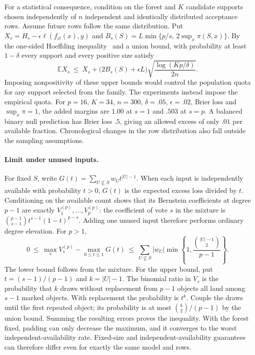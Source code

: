 For a statistical consequence, condition on the forest and $K$ candidate
supports chosen independently of $n$ independent and identically distributed
acceptance rows. Assume future rows follow the same distribution. Put
$X_s=H_s-\epsilon\ell(f_\varnothing(x),y)$ and
$B_s(S)=L\min\{p/s,\,2\sup_x\pi(S,x)\}$. By the one-sided Hoeffding
inequality~\citep{hoeffding1963probability} and a union bound, with probability
at least $1-\delta$ every support and every positive size satisfy
\[
  \mathbb E X_s\ \le\ \overline X_s+
      \bigl(2B_s(S)+\epsilon L\bigr)
      \sqrt{\frac{\log(Kp/\delta)}{2n}} .
\]
Imposing nonpositivity of these upper bounds would control the population
quota for any support selected from the family. The experiments instead
impose the empirical quota. For $p=16$, $K=34$, $n=300$, $\delta=.05$,
$\epsilon=.02$, Brier loss and $\sup_x\pi=1$, the added margins are
$1.00$ at $s=1$ and $.503$ at $s=p$. A balanced binary null prediction has
Brier loss $.5$, giving an allowed excess of only $.01$ per available
fraction. Chronological changes in the row distribution also fall outside
the sampling assumptions.

\paragraph{Limit under unused inputs.}\label{app:padding}
For fixed $S$, write $G(t)=\sum_{U\not\subseteq S} w_U t^{|U|-1}$.
When each input is independently available with probability $t>0$,
$G(t)$ is the expected excess loss divided by $t$. Conditioning on the
available count shows that its Bernstein coefficients at degree $p-1$
are exactly $V_1^{(p)},\ldots,V_p^{(p)}$: the coefficient of vote $s$
in the mixture is $\binom{p-1}{s-1} t^{s-1}(1-t)^{p-s}$. Adding one
unused input therefore performs ordinary degree elevation. For $p>1$,
\[
0\ \le\ \max_s V_s^{(p)}-\max_{0\le t\le1}G(t)\
\le\ \sum_{U\not\subseteq S}|w_U|
          \min\!\left\{1,\frac{\binom{|U|-1}{2}}{p-1}\right\}.
\]
The lower bound follows from the mixture. For the upper bound, put
$t=(s-1)/(p-1)$ and $k=|U|-1$. The binomial ratio in $V_s$ is the
probability that $k$ draws without replacement from $p-1$ objects all
land among $s-1$ marked objects. With replacement the probability is
$t^k$. Couple the draws until the first repeated object; its probability
is at most $\binom{k}{2}/(p-1)$ by the union bound. Summing the resulting
errors proves the inequality. With the forest fixed, padding can only
decrease the maximum, and it converges to the worst independent-availability
rate. Fixed-size and independent-availability guarantees can therefore
differ even for exactly the same model and rows.
